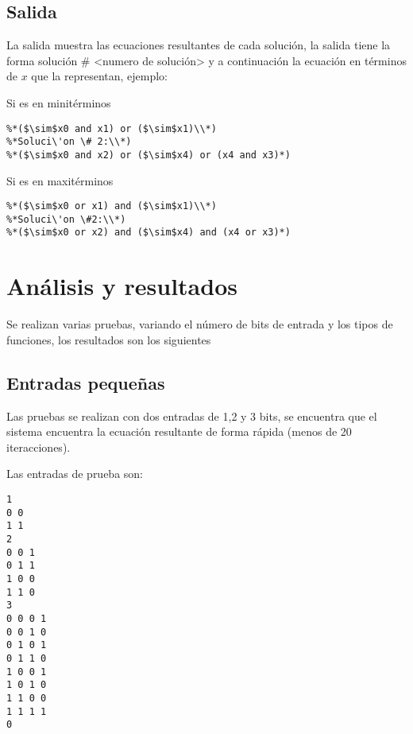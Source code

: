 \documentclass[letter]{article}
\begin{document}
\subsection{Salida}

La salida muestra las ecuaciones resultantes de cada solución, la salida tiene la forma solución \# <numero de solución> y a continuación la ecuación en términos de $x$ que la representan, ejemplo:

Si es en minitérminos
\lstset{frameround=fttt}
\begin{lstlisting}[frame=trBL]
%*Soluci\'on \# 1:\\*)
%*($\sim$x0 and x1) or ($\sim$x1)\\*)
%*Soluci\'on \# 2:\\*)
%*($\sim$x0 and x2) or ($\sim$x4) or (x4 and x3)*)
\end{lstlisting}

Si es en maxitérminos
\lstset{frameround=fttt}
\begin{lstlisting}[frame=trBL]
%*Soluci\'{o}n \#1:\\*)
%*($\sim$x0 or x1) and ($\sim$x1)\\*)
%*Soluci\'on \#2:\\*)
%*($\sim$x0 or x2) and ($\sim$x4) and (x4 or x3)*)
\end{lstlisting}

\section{Análisis y resultados}

Se realizan varias pruebas, variando el número de bits de entrada y los tipos de funciones, los resultados son los siguientes

\subsection{Entradas pequeñas}

Las pruebas se realizan con dos entradas de 1,2  y 3 bits, se encuentra que el sistema encuentra la ecuación resultante de forma rápida (menos de 20 iteracciones).

Las entradas de prueba son:

\lstset{frameround=fttt}
\begin{lstlisting}[frame=trBL]
1
0 0
1 1
2
0 0 1
0 1 1
1 0 0
1 1 0
3
0 0 0 1
0 0 1 0 
0 1 0 1
0 1 1 0
1 0 0 1
1 0 1 0
1 1 0 0
1 1 1 1
0
\end{lstlisting}
\end{document}
